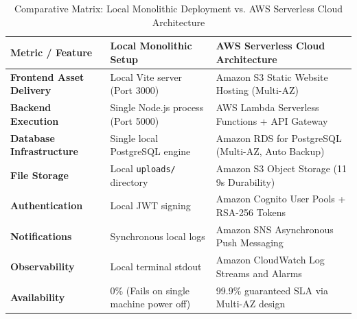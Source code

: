 \begin{table}[htbp]
\centering
\caption{Comparative Matrix: Local Monolithic Deployment vs. AWS Serverless Cloud Architecture}
\label{tab:local_vs_aws}
\small
\begin{tabular}{L{3.5cm} L{5.5cm} L{6.0cm}}
\hline
\textbf{Metric / Feature} & \textbf{Local Monolithic Setup} & \textbf{AWS Serverless Cloud Architecture} \\ \hline
\textbf{Frontend Asset Delivery} & Local Vite server (Port 3000) & Amazon S3 Static Website Hosting (Multi-AZ) \\
\textbf{Backend Execution} & Single Node.js process (Port 5000) & AWS Lambda Serverless Functions + API Gateway \\
\textbf{Database Infrastructure} & Single local PostgreSQL engine & Amazon RDS for PostgreSQL (Multi-AZ, Auto Backup) \\
\textbf{File Storage} & Local \texttt{uploads/} directory & Amazon S3 Object Storage (11 9s Durability) \\
\textbf{Authentication} & Local JWT signing & Amazon Cognito User Pools + RSA-256 Tokens \\
\textbf{Notifications} & Synchronous local logs & Amazon SNS Asynchronous Push Messaging \\
\textbf{Observability} & Local terminal stdout & Amazon CloudWatch Log Streams and Alarms \\
\textbf{Availability} & 0\% (Fails on single machine power off) & 99.9\% guaranteed SLA via Multi-AZ design \\ \hline
\end{tabular}
\end{table}
